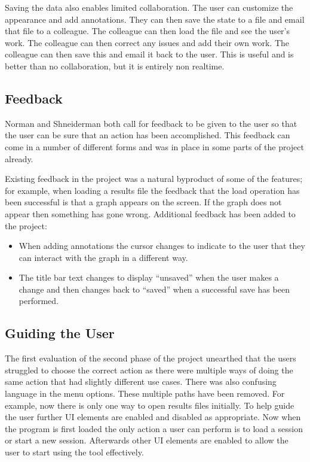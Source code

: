 Saving the data also enables limited collaboration.  The user can customize the appearance and add annotations.  They can then save the state to a file and email that file to a colleague.  The colleague can then load the file and see the user's work.  The colleague can then correct any issues and add their own work.  The colleague can then save this and email it back to the user.  This is useful and is better than no collaboration, but it is entirely non realtime.

\subsection{Feedback}
Norman and Shneiderman both call for feedback to be given to the user so that the user can be sure that an action has been accomplished.  This feedback can come in a number of different forms and was in place in some parts of the project already.

Existing feedback in the project was a natural byproduct of some of the features; for example, when loading a results file the feedback that the load operation has been successful is that a graph appears on the screen. If the graph does not appear then something has gone wrong.  Additional feedback has been added to the project:
\begin{itemize}
\item When adding annotations the cursor changes to indicate to the user that they can interact with the graph in a different way.
\item The title bar text changes to display ``unsaved'' when the user makes a change and then changes back to ``saved'' when a successful save has been performed.
\end{itemize}

\subsection{Guiding the User}

The first evaluation of the second phase of the project unearthed that the users struggled to choose the correct action as there were multiple ways of doing the same action that had slightly different use cases.  There was also confusing language in the menu options.  These multiple paths have been removed. For example, now there is only one way to open results files initially.  To help guide the user further \ac{UI} elements are enabled and disabled as appropriate.  Now when the program is first loaded the only action a user can perform is to load a session or start a new session.  Afterwards other \ac{UI} elements are enabled to allow the user to start using the tool effectively.


